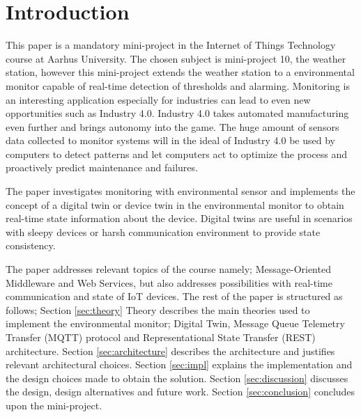 \section{Introduction}
This paper is a mandatory mini-project in the Internet of Things Technology course at Aarhus University. The chosen subject is mini-project 10, the weather station, however this mini-project extends the weather station to a environmental monitor capable of real-time detection of thresholds and alarming. Monitoring is an interesting application especially for industries can lead to even new opportunities such as Industry 4.0. Industry 4.0 takes automated manufacturing even further and brings autonomy into the game. The huge amount of sensors data collected to monitor systems will in the ideal of Industry 4.0 be used by computers to detect patterns and let computers act to optimize the process and proactively predict maintenance and failures.

The paper investigates monitoring with environmental sensor and implements the concept of a digital twin or device twin in the environmental monitor to obtain real-time state information about the device. Digital twins are useful in scenarios with sleepy devices or harsh communication environment to provide state consistency.

The paper addresses relevant topics of the course namely; Message-Oriented Middleware and Web Services, but also addresses possibilities with real-time communication and state of IoT devices.  The rest of the paper is structured as follows; Section \ref{sec:theory} Theory describes the main theories used to implement the environmental monitor; Digital Twin, Message Queue Telemetry Transfer (MQTT) protocol and Representational State Transfer (REST) architecture. Section \ref{sec:architecture} describes the architecture and justifies relevant architectural choices. Section \ref{sec:impl} explains the implementation and the design choices made to obtain the solution. Section \ref{sec:discussion} discusses the design, design alternatives and future work. Section \ref{sec:conclusion} concludes upon the mini-project.


